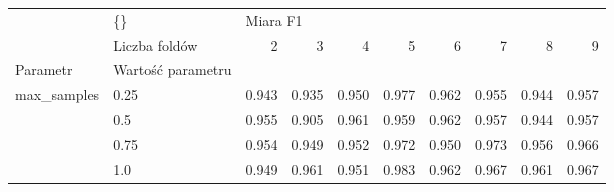 \begin{tabular}{llrrrrrrrr}
\hline
            & \{\} & \multicolumn{8}{l}{Miara F1} \\
            & Liczba foldów &        2 &      3 &      4 &      5 &      6 &      7 &      8 &      9 \\
Parametr & Wartość parametru &          &        &        &        &        &        &        &        \\
\hline
max\_samples & 0.25 &    0.943 &  0.935 &  0.950 &  0.977 &  0.962 &  0.955 &  0.944 &  0.957 \\
            & 0.5 &    0.955 &  0.905 &  0.961 &  0.959 &  0.962 &  0.957 &  0.944 &  0.957 \\
            & 0.75 &    0.954 &  0.949 &  0.952 &  0.972 &  0.950 &  0.973 &  0.956 &  0.966 \\
            & 1.0 &    0.949 &  0.961 &  0.951 &  0.983 &  0.962 &  0.967 &  0.961 &  0.967 \\
\hline
\end{tabular}
